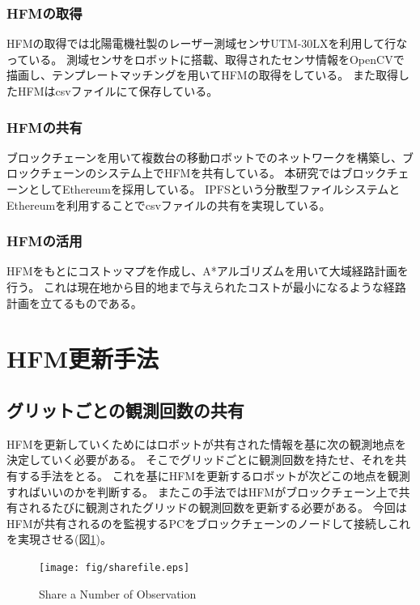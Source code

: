 \documentclass{jsarticle}
\begin{document}
\subsubsection{HFMの取得}
HFMの取得では北陽電機社製のレーザー測域センサUTM-30LXを利用して行なっている。
測域センサをロボットに搭載、取得されたセンサ情報をOpenCVで描画し、テンプレートマッチングを用いてHFMの取得をしている。
また取得したHFMはcsvファイルにて保存している。

\subsubsection{HFMの共有}
ブロックチェーンを用いて複数台の移動ロボットでのネットワークを構築し、ブロックチェーンのシステム上でHFMを共有している。
本研究ではブロックチェーンとしてEthereumを採用している。
IPFSという分散型ファイルシステムとEthereumを利用することでcsvファイルの共有を実現している。


\subsubsection{HFMの活用}
HFMをもとにコストッマプを作成し、A*アルゴリズムを用いて大域経路計画を行う。
これは現在地から目的地まで与えられたコストが最小になるような経路計画を立てるものである。



\section{HFM更新手法}
\subsection{グリットごとの観測回数の共有}
HFMを更新していくためにはロボットが共有された情報を基に次の観測地点を決定していく必要がある。
そこでグリッドごとに観測回数を持たせ、それを共有する手法をとる。
これを基にHFMを更新するロボットが次どこの地点を観測すればいいのかを判断する。
またこの手法ではHFMがブロックチェーン上で共有されるたびに観測されたグリッドの観測回数を更新する必要がある。
今回はHFMが共有されるのを監視するPCをブロックチェーンのノードして接続しこれを実現させる(図\ref{fig: sharefile})。

\begin{figure}[tbh]
 \centering
  \texttt{[image: fig/sharefile.eps]}
  \vspace*{-4mm}
  \caption{Share a Number of Observation}
  \label{fig: sharefile}
\end{figure}
\end{document}

